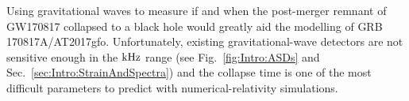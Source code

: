 \documentclass[../Thesis.tex]{subfiles}
\begin{document}
    Using gravitational waves to measure if and when the post-merger remnant of GW170817 collapsed to a black hole would greatly aid the modelling of GRB 170817A/AT2017gfo.
    Unfortunately, existing gravitational-wave detectors are not sensitive enough in the $\mathrm{kHz}$ range (see Fig.~\ref{fig:Intro:ASDs} and Sec.~\ref{sec:Intro:StrainAndSpectra}) and the collapse time is one of the most difficult parameters to predict with numerical-relativity simulations.




    
    
    
\end{document}
